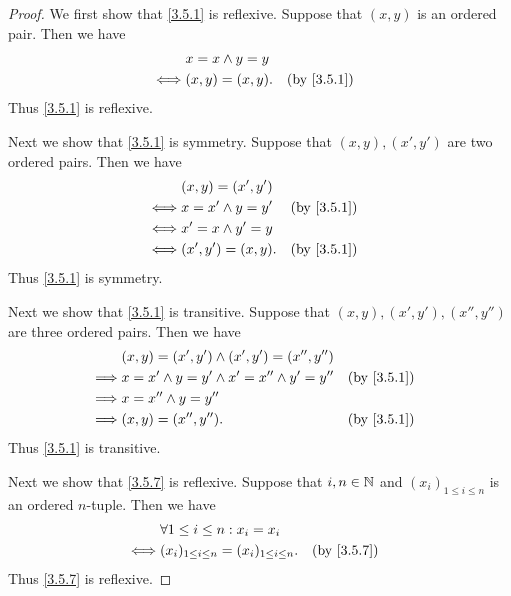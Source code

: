 \begin{proof}
  We first show that \cref{3.5.1} is reflexive.
  Suppose that \((x, y)\) is an ordered pair.
  Then we have
  \begin{align*}
         & x = x \land y = y                               \\
    \iff & (x, y) = (x, y).  &  & \text{(by \cref{3.5.1})}
  \end{align*}
  Thus \cref{3.5.1} is reflexive.

  Next we show that \cref{3.5.1} is symmetry.
  Suppose that \((x, y), (x', y')\) are two ordered pairs.
  Then we have
  \begin{align*}
         & (x, y) = (x', y')                                 \\
    \iff & x = x' \land y = y' &  & \text{(by \cref{3.5.1})} \\
    \iff & x' = x \land y' = y                               \\
    \iff & (x', y') = (x, y).  &  & \text{(by \cref{3.5.1})}
  \end{align*}
  Thus \cref{3.5.1} is symmetry.

  Next we show that \cref{3.5.1} is transitive.
  Suppose that \((x, y), (x', y'), (x'', y'')\) are three ordered pairs.
  Then we have
  \begin{align*}
             & (x, y) = (x', y') \land (x', y') = (x'', y'')                                   \\
    \implies & x = x' \land y = y' \land x' = x'' \land y' = y'' &  & \text{(by \cref{3.5.1})} \\
    \implies & x = x'' \land y = y''                                                           \\
    \implies & (x, y) = (x'', y'').                              &  & \text{(by \cref{3.5.1})}
  \end{align*}
  Thus \cref{3.5.1} is transitive.

  Next we show that \cref{3.5.7} is reflexive.
  Suppose that \(i, n \in \mathbb{N}\) and \((x_i)_{1 \leq i \leq n}\) is an ordered \(n\)-tuple.
  Then we have
  \begin{align*}
         & \forall 1 \leq i \leq n : x_i = x_i                                              \\
    \iff & (x_i)_{1 \leq i \leq n} = (x_i)_{1 \leq i \leq n}. &  & \text{(by \cref{3.5.7})}
  \end{align*}
  Thus \cref{3.5.7} is reflexive.


\end{proof}
